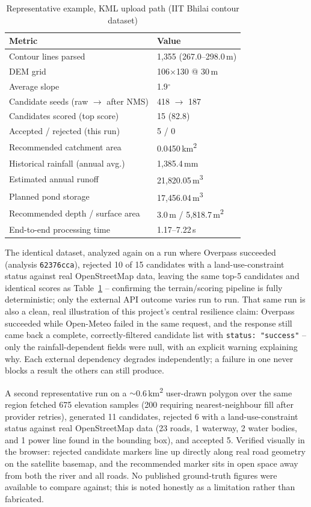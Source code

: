 \documentclass[manuscript,screen]{acmart}
\begin{document}
\begin{table}[h]
  \caption{Representative example, KML upload path (IIT Bhilai contour dataset)}
  \label{tab:results-kml}
  \begin{tabular}{p{4.4cm}p{2.8cm}}
    \toprule
    Metric & Value \\
    \midrule
    Contour lines parsed & 1{,}355 (267.0--298.0\,m) \\
    DEM grid & 106$\times$130 @ 30\,m \\
    Average slope & 1.9$^\circ$ \\
    Candidate seeds (raw $\to$ after NMS) & 418 $\to$ 187 \\
    Candidates scored (top score) & 15 (82.8) \\
    Accepted / rejected (this run) & 5 / 0 \\
    Recommended catchment area & 0.0450\,km\textsuperscript{2} \\
    Historical rainfall (annual avg.) & 1{,}385.4\,mm \\
    Estimated annual runoff & 21{,}820.05\,m\textsuperscript{3} \\
    Planned pond storage & 17{,}456.04\,m\textsuperscript{3} \\
    Recommended depth / surface area & 3.0\,m / 5{,}818.7\,m\textsuperscript{2} \\
    End-to-end processing time & 1.17--7.22\,s \\
    \bottomrule
  \end{tabular}
\end{table}

The identical dataset, analyzed again on a run where Overpass succeeded
(analysis \texttt{62376cca}), rejected 10 of 15 candidates with a
land-use-constraint status against real OpenStreetMap data, leaving the
same top-5 candidates and identical scores as Table~\ref{tab:results-kml}
-- confirming the terrain/scoring pipeline is fully deterministic; only
the external API outcome varies run to run. That same run is also a
clean, real illustration of this project's central resilience claim:
Overpass succeeded while Open-Meteo failed in the same request, and the
response still came back a complete, correctly-filtered candidate list
with \texttt{status: "success"} -- only the rainfall-dependent fields
were null, with an explicit warning explaining why. Each external
dependency degrades independently; a failure in one never blocks a
result the others can still produce.

A second representative run on a $\sim$0.6\,km\textsuperscript{2}
user-drawn polygon over the same region fetched 675 elevation samples
(200 requiring nearest-neighbour fill after provider retries), generated
11 candidates, rejected 6 with a land-use-constraint status against real
OpenStreetMap data (23 roads, 1 waterway, 2 water bodies, and 1 power line
found in the bounding box), and accepted 5. Verified visually in the
browser: rejected candidate markers line up directly along real road
geometry on the satellite basemap, and the recommended marker sits in
open space away from both the river and all roads. No published
ground-truth figures were available to compare against; this is noted
honestly as a limitation rather than fabricated.
\end{document}
